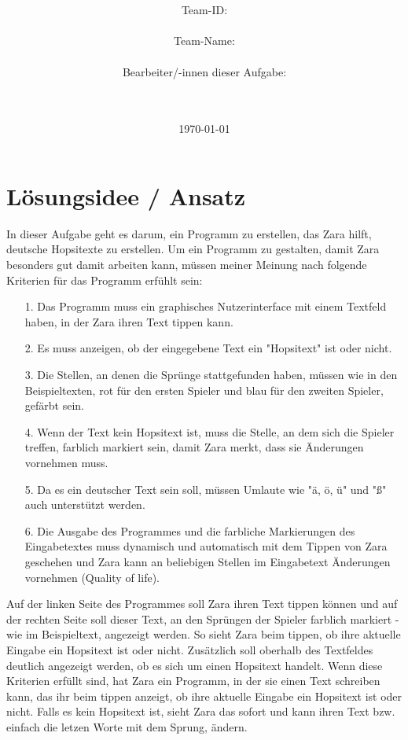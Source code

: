 \documentclass[a4paper,10pt,ngerman]{scrartcl}
\title{\textbf{\Huge\Aufgabe}}
\author{\LARGE Team-ID: \LARGE \TeamId \\\\
	    \LARGE Team-Name: \LARGE \TeamName \\\\
	    \LARGE Bearbeiter/-innen dieser Aufgabe: \\ 
	    \LARGE \Namen\\\\}
\date{\LARGE\today}
\begin{document}
\maketitle
\tableofcontents

\vspace{0.5cm}

\section{Lösungsidee / Ansatz}
In dieser Aufgabe geht es darum, ein Programm zu erstellen, das Zara hilft, deutsche Hopsitexte zu erstellen. 
Um ein Programm zu gestalten, damit Zara besonders gut damit arbeiten kann, müssen meiner Meinung nach folgende Kriterien für das Programm erfühlt sein: 
\begin{itemize}
    \item[1.]Das Programm muss ein graphisches Nutzerinterface mit einem Textfeld haben, in der Zara ihren Text tippen kann.
    \item[2.]Es muss anzeigen, ob der eingegebene Text ein "Hopsitext" ist oder nicht.
    \item[3.]Die Stellen, an denen die Sprünge stattgefunden haben, müssen wie in den Beispieltexten, rot für den ersten Spieler und blau für den zweiten Spieler, gefärbt sein.
    \item[4.]Wenn der Text kein Hopsitext ist, muss die Stelle, an dem sich die Spieler treffen, farblich markiert sein, damit Zara merkt, dass sie Änderungen vornehmen muss.
    \item[5.]Da es ein deutscher Text sein soll, müssen Umlaute wie "ä, ö, ü" und "ß" auch unterstützt werden.
    \item[6.]Die Ausgabe des Programmes und die farbliche Markierungen des Eingabetextes muss dynamisch und automatisch mit dem Tippen von Zara geschehen und Zara kann an beliebigen Stellen im Eingabetext Änderungen vornehmen (Quality of life).
\end{itemize}
Auf der linken Seite des Programmes soll Zara ihren Text tippen können und auf der rechten Seite soll dieser Text, an den Sprüngen der Spieler farblich markiert - wie im Beispieltext, angezeigt werden.
So sieht Zara beim tippen, ob ihre aktuelle Eingabe ein Hopsitext ist oder nicht. Zusätzlich soll oberhalb des Textfeldes deutlich angezeigt werden, ob es sich um einen Hopsitext handelt.
Wenn diese Kriterien erfüllt sind, hat Zara ein Programm, in der sie einen Text schreiben kann, das ihr beim tippen anzeigt, ob ihre aktuelle Eingabe ein Hopsitext ist oder nicht. Falls es kein Hopsitext ist, sieht Zara das sofort und kann ihren Text bzw. einfach die letzen Worte mit dem Sprung, ändern.
\end{document}
